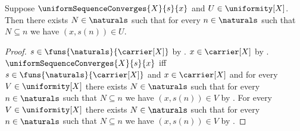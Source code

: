 \begin{proposition}\label{uniform_sequence_convergence_entourage}
    Suppose $\uniformSequenceConverges{X}{s}{x}$ and
        $U\in\uniformity[X]$.
    Then there exists $N\in\naturals$ such that for every
        $n\in\naturals$ such that $N\subseteq n$ we have $(x,s(n))\in U$.
\end{proposition}
\begin{proof}
    $s\in\funs{\naturals}{\carrier[X]}$ by
        .
    $x\in\carrier[X]$ by .
    $\uniformSequenceConverges{X}{s}{x}$ iff
        $s\in\funs{\naturals}{\carrier[X]}$ and $x\in\carrier[X]$ and for
            every $V\in\uniformity[X]$ there exists $N\in\naturals$ such
            that for every $n\in\naturals$ such that $N\subseteq n$ we have
            $(x,s(n))\in V$ by
        .
    For every $V\in\uniformity[X]$ there exists $N\in\naturals$ such that
        for every $n\in\naturals$ such that $N\subseteq n$ we have
        $(x,s(n))\in V$ by \auto.
\end{proof}
